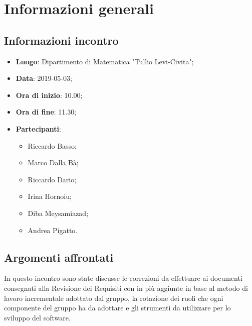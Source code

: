 \section{Informazioni generali}

\subsection{Informazioni incontro}
\begin{itemize}
	\item \textbf{Luogo}: Dipartimento di Matematica "Tullio Levi-Civita";
	\item \textbf{Data}: 2019-05-03;
	\item \textbf{Ora di inizio}: 10.00;
	\item \textbf{Ora di fine}: 11.30;
	\item \textbf{Partecipanti}: 
	\begin{itemize}
		\item Riccardo Basso;
		\item Marco Dalla Bà;
		\item Riccardo Dario;
		\item Irina Hornoiu;
		\item Diba Meysamiazad;
		\item Andrea Pigatto.	
	\end{itemize}
\end{itemize}

\subsection{Argomenti affrontati}
In questo incontro sono state discusse le correzioni da effettuare ai documenti consegnati alla Revisione dei Requisiti con in più aggiunte in base al metodo di lavoro incrementale adottato dal gruppo, la rotazione dei ruoli che ogni componente del gruppo ha da adottare e gli strumenti da utilizzare per lo sviluppo del software.
